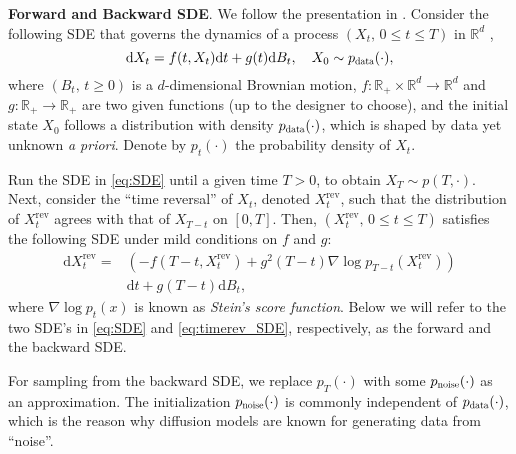 \documentclass{article}
\theoremstyle{plain}
\theoremstyle{definition}
\theoremstyle{remark}
\begin{document}
\textbf{Forward and Backward SDE}. 
We follow the presentation in \cite{SBDM_tutorial}.
Consider the following SDE that governs the dynamics of a process $(X_t, \, 0 \le t \le T)$ in $\mathbb{R}^d$ \cite{Song20SGMbySDE},
\begin{equation}
\label{eq:SDE}
\mathrm{d}X_t = f(t, X_t) \mathrm{d}t + g(t) \mathrm{d}B_t, \quad X_0 \sim p_{\scalebox{0.7}{data}}(\cdot),
\end{equation}
where $(B_t, \, t \ge 0)$ is a $d$-dimensional Brownian motion, 
$f: \mathbb{R}_+ \times \mathbb{R}^d \to \mathbb{R}^d$ and $g: \mathbb{R}_+ \to \mathbb{R}_+$ are two given functions (up to the designer to choose), 
and the initial state $X_0$ follows a distribution %
with density $p_{\scalebox{0.7}{data}}(\cdot)$, 
which is shaped by data yet unknown {\it a priori}.  
Denote by $p_t(\cdot)$ the probability density of $X_t$.

Run the SDE in \eqref{eq:SDE} until a given time $T>0$,  to obtain $X_T \sim p(T, \cdot)$. 
Next, consider the  ``time reversal'' of $X_t$, 
denoted $X^{\text{rev}}_t$, such that
the distribution of 
$X^{\text{rev}}_t$ agrees with that of 
$X_{T-t}$ on $[0,T]$. 
Then, $(X^{\text{rev}}_t, \, 0 \le t \le T)$ satisfies the following SDE under mild conditions on $f$ and $g$:
\begin{align}
\label{eq:timerev_SDE}
\mathrm{d} X^{\text{rev}}_t = &\left(-f(T-t,X^{\text{rev}}_t) + g^2(T-t) \nabla \log p_{T-t} (X^{\text{rev}}_t) \right) \nonumber \\
&\mathrm{d} t + g(T-t) \mathrm{d} B_t,
\end{align}
where $\nabla\log p_t(x)$ is known as {\em Stein's score function}. 
Below we will refer to the two SDE's in \eqref{eq:SDE} and \eqref{eq:timerev_SDE}, respectively, as the forward and the backward SDE.

For sampling from the backward SDE, we replace $p_T( \cdot)$ with some $p_{\scalebox{0.7}{noise}}(\cdot)$ as an approximation. 
The initialization $p_{\scalebox{0.7}{noise}}(\cdot)$ is commonly independent of $p_{\scalebox{0.7}{data}}(\cdot)$, 
which is the reason why diffusion models are known for generating data from ``noise''.
\end{document}
